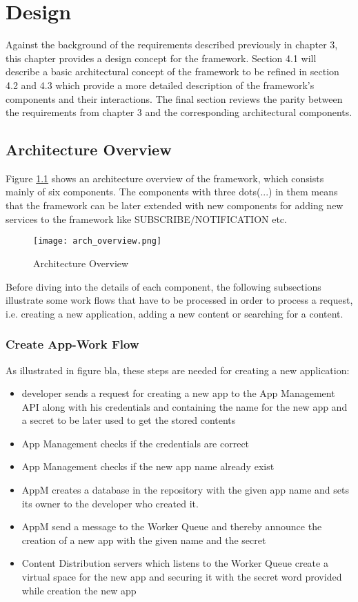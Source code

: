 \chapter{Design\label{cha:chapter4}}
Against the background of the requirements described previously in chapter 3, this chapter provides a design concept for the framework. Section 4.1 will describe a basic architectural concept of the framework to be refined in section 4.2 and 4.3 which provide a more detailed description of the framework's components and their interactions. The final section reviews the parity between the requirements from chapter 3 and the corresponding architectural components. 
        


\section{Architecture Overview\label{sec:des_ar_ov}}
Figure \ref{fig:arch_overview} shows an architecture overview of the framework, which consists mainly of six components. The components with three dots(...) in them means that the framework can be later extended with new components for adding new services to the framework like SUBSCRIBE/NOTIFICATION etc.

\begin{figure}[htb]
  \centering
  \texttt{[image: arch\_overview.png]}\\
  \caption{Architecture Overview}
  \label{fig:arch_overview}
\end{figure}

Before diving into the details of each component, the following subsections illustrate some work flows that have to be processed in order to process a request, i.e. creating a new application, adding a new content or searching for a content.

\subsection{Create App-Work Flow}
As illustrated in figure bla, these steps are needed for creating a new application:

\begin{itemize}
\item developer sends a request for creating a new app to the App Management API along with his credentials and containing the name for the new app and a secret to be later used to get the stored contents
\item App Management checks if the credentials are correct
\item App Management checks if the new app name already exist
\item AppM creates a database in the repository with the given app name and sets its owner to the developer who created it.
\item AppM send a message to the Worker Queue and thereby announce the creation of a new app with the given name and the secret
\item Content Distribution servers which listens to the Worker Queue create a virtual space for the new app and securing it with the secret word provided while creation the new app
\end{itemize}

